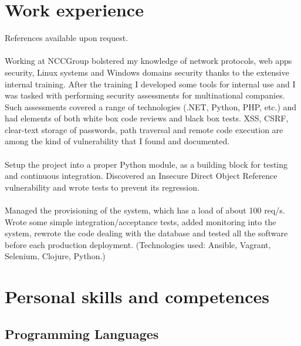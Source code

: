 \documentclass[helvetica,narrow,english,booktabs,a4paper]{moderncv}
\begin{document}
  \makecvtitle

  \section{Work experience}
  References available upon request.
  \\
  \\
  Working at NCCGroup bolstered my knowledge of network protocols, web apps security, Linux systems and Windows domains security thanks to the extensive internal training. After the training I developed some tools for internal use and I was tasked with performing security assessments for multinational companies. Such assessments covered a range of technologies (.NET, Python, PHP, etc.) and had elements of both white box code reviews and black box tests. XSS, CSRF, clear-text storage of passwords, path traversal and remote code execution are among the kind of vulnerability that I found and documented.
  \\
  \\
  Setup the project into a proper Python module, as a building block for testing and continuous integration. Discovered an Insecure Direct Object Reference vulnerability and wrote tests to prevent its regression.
  \\
  \\
  Managed the provisioning of the system, which has a load of about 100 req/s. Wrote some simple integration/acceptance tests, added monitoring into the system, rewrote the code dealing with the database and tested all the software before each production deployment. (Technologies used: Ansible, Vagrant, Selenium, Clojure, Python.)

  \section{Personal skills and competences}
  \subsection{Programming Languages}

\end{document}
